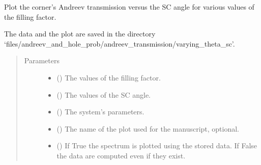 \documentclass[letterpaper,10pt,english]{sphinxmanual}
\begin{document}

\begin{fulllineitems}
\label{\detokenize{modules:modules.utils.plot_tau_vs_theta_sc_various_fillings}}
\pysigstartsignatures
{}
\pysigstopsignatures
\sphinxAtStartPar
Plot the corner’s Andreev transmission versus the SC angle for various values of the filling factor.

\sphinxAtStartPar
The data and the plot are saved in the directory 
‘files/andreev\_and\_hole\_prob/andreev\_transmission/varying\_theta\_sc’.
\begin{quote}\begin{description}
\item[{Parameters}] \leavevmode\begin{itemize}
\item {} 
\sphinxAtStartPar
{} () \textendash{} The values of the filling factor.

\item {} 
\sphinxAtStartPar
{} () \textendash{} The values of the SC angle.

\item {} 
\sphinxAtStartPar
{} () \textendash{} The system’s parameters.

\item {} 
\sphinxAtStartPar
{} () \textendash{} The name of the plot used for the manuscript, optional.

\item {} 
\sphinxAtStartPar
{} () \textendash{} If True the spectrum is plotted using the stored data.
If False the data are computed even if they exist.


\end{itemize}
\end{description}
\end{quote}
\end{fulllineitems}
\end{document}

